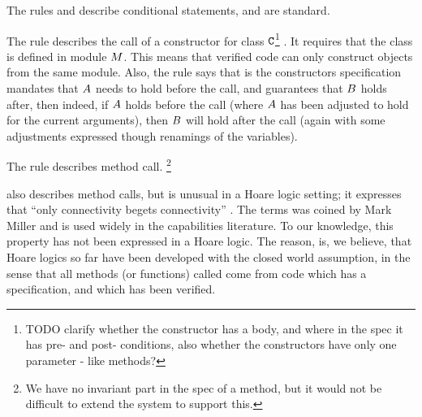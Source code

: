 The rules   and  describe conditional statements, and are standard.


The rule  describes the call of a constructor for class ${\textrm{\ttfamily{C}}}$\footnote{TODO clarify whether the constructor has a body, and where in the spec it has pre- and post- conditions, also whether the constructors have only one parameter - like methods?} . It requires that the class is defined in module $M$. This means that verified code can only construct objects from the same module. Also, the rule says that is the constructors specification mandates that $A$ needs to hold before the call, and guarantees that $B$ holds after, then indeed, if $A$ holds before the call (where $A$ has been adjusted to hold for the current arguments), then $B$ will hold after the call (again with some adjustments expressed though renamings of the variables).

 The   rule     describes method call.  \footnote{We have no invariant part in the spec of a method,  but it would not be difficult to extend the system to support this.}



  also describes method calls, but is unusual in a Hoare logic setting; it expresses that  ``only connectivity
begets connectivity'' . The terms was coined by Mark Miller  and is used widely in the capabilities literature. To our knowledge, this property has not been expressed in a Hoare logic. The reason, is, we believe, that Hoare logics so far have been developed with the closed world assumption, in the sense that all methods (or functions) called come from code which has a specification, and which has been verified.


